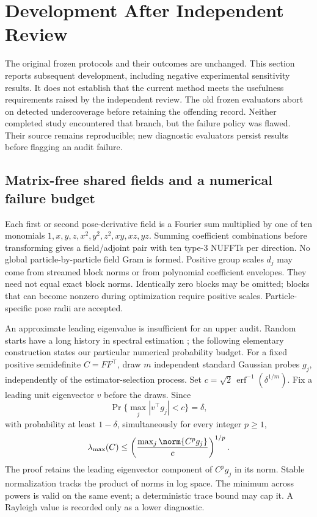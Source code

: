 \section{Development After Independent Review}\label{sec:revision}
The original frozen protocols and their outcomes are unchanged. This section
reports subsequent development, including negative experimental sensitivity
results. It does not establish that the current method meets the usefulness
requirements raised by the independent review.
The old frozen evaluators abort on detected undercoverage before retaining the
offending record. Neither completed study encountered that branch, but the
failure policy was flawed. Their source remains reproducible; new diagnostic
evaluators persist results before flagging an audit failure.

\subsection{Matrix-free shared fields and a numerical failure budget}
Each first or second pose-derivative field is a Fourier sum multiplied by one of
ten monomials $1,x,y,z,x^2,y^2,z^2,xy,xz,yz$. Summing coefficient combinations
before transforming gives a field/adjoint pair with ten type-3 NUFFTs per
direction. No global particle-by-particle field Gram is formed. Positive group
scales $d_j$ may come from streamed block norms or from polynomial coefficient
envelopes. They need not equal exact block norms. Identically zero blocks may
be omitted; blocks that can become nonzero during optimization require positive
scales. Particle-specific pose radii are accepted.

An approximate leading eigenvalue is insufficient for an upper audit. Random
starts have a long history in spectral estimation \citep{kw1992}; the following
elementary construction states our particular numerical probability budget.
For a fixed positive semidefinite $C=FF^\top$, draw $m$ independent standard
Gaussian probes $g_j$, independently of the estimator-selection process. Set
$c=\sqrt{2}\,\operatorname{erf}^{-1}(\delta^{1/m})$. Fix a leading unit
eigenvector $v$ before the draws. Since
\[
 \Pr\{\max_j|v^\top g_j|<c\}=\delta,
\]
with probability at least $1-\delta$, simultaneously for every integer $p\ge1$,
\begin{equation}
 \lambda_{\max}(C)
 \le \left(\frac{\max_j\norm{C^p g_j}}{c}\right)^{1/p}.
 \label{eq:randompower}
\end{equation}
The proof retains the leading eigenvector component of $C^p g_j$ in its norm.
Stable normalization tracks the product of norms in log space. The minimum
across powers is valid on the same event; a deterministic trace bound may cap
it. A Rayleigh value is recorded only as a lower diagnostic.

